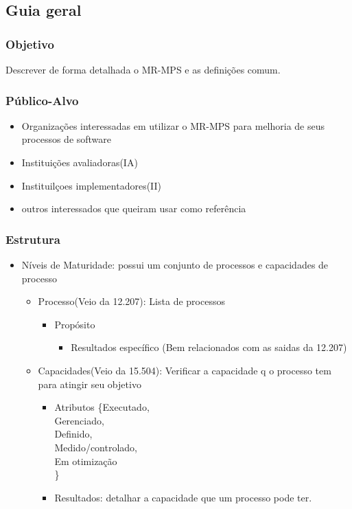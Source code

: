 \documentclass{article}
\begin{document}
\subsection{Guia geral} \date{31 de Março de 2014}

\subsubsection{Objetivo} Descrever de forma detalhada o MR-MPS e as definições comum.
\subsubsection{Público-Alvo} 
	\begin{itemize}
		\item Organizações interessadas em utilizar o MR-MPS para melhoria de seus processos de software
		\item Instituições avaliadoras(IA)
		\item Instituilçoes implementadores(II)
		\item outros interessados que queiram usar como referência
	\end{itemize} 
\subsubsection{Estrutura}

	\begin{itemize}
	\item Níveis de Maturidade: possui um conjunto de processos e capacidades de processo
		\begin{itemize}
		\item Processo(Veio da 12.207): Lista de processos
			\begin{itemize}
			\item Propósito
				\begin{itemize}
				\item Resultados específico (Bem relacionados com as saidas da 12.207)
				\end{itemize}
					 
			\end{itemize}

			\item Capacidades(Veio da 15.504): Verificar a capacidade q o processo tem para atingir seu objetivo	
				\begin{itemize}
				\item Atributos \{Executado,\\ Gerenciado,\\ Definido,\\ Medido/controlado, \\Em otimização\\ \}
				\item Resultados: detalhar a capacidade que um processo pode ter.
				\end{itemize}
		\end{itemize}			 
	\end{itemize}
\end{document}
